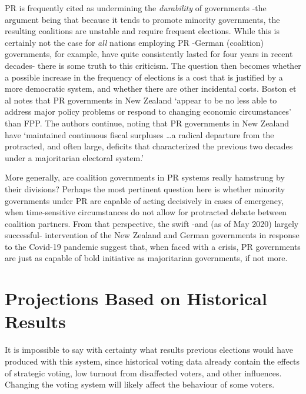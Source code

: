 PR is frequently cited as undermining the \emph{durability} of governments \--the argument being that because it tends to promote minority governments, the resulting coalitions are unstable and require frequent elections.
While this is certainly not the case for \emph{all} nations employing PR \--German (coalition) governments, for example, have quite consistently lasted for four years in recent decades\-- there is some truth to this criticism.
The question then becomes whether a possible increase in the frequency of elections is a cost that is justified by a more democratic system, and whether there are other incidental costs.
Boston et al notes that PR governments in New Zealand `appear to be no less able to address major policy problems or respond to changing economic circumstances' than FPP. The authors continue, noting that PR governments in New Zealand have `maintained continuous fiscal surpluses \ldots a radical departure from the protracted, and often large, deficits that characterized the previous two decades under a majoritarian electoral system.'\citep{Boston}

More generally, are coalition governments in PR systems really hamstrung by their divisions? Perhaps the most pertinent question here is whether minority governments under PR are capable of acting decisively in cases of emergency, when time-sensitive circumstances do not allow for protracted debate between coalition partners.
From that perspective, the swift \--and (as of May 2020) largely successful\-- intervention of the New Zealand and German governments in response to the Covid-19 pandemic suggest that, when faced with a crisis, PR governments are just as capable of bold initiative as majoritarian governments, if not more.


\section{Projections Based on Historical Results}
\label{sec:projections}

It is impossible to say with certainty what results previous elections would have produced with this system, since historical voting data already contain the effects of strategic voting, low turnout from disaffected voters, and other influences. Changing the voting system will likely affect the behaviour of some voters.


